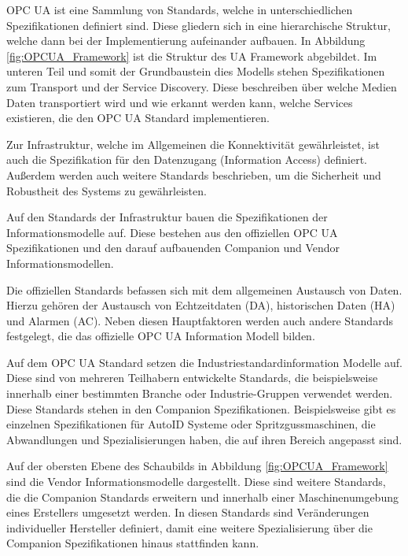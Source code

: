 \documentclass[a4paper, 12pt, oneside]{scrbook}
\begin{document}
		OPC UA ist eine Sammlung von Standards, welche in unterschiedlichen Spezifikationen definiert sind. Diese gliedern sich in eine hierarchische Struktur, welche dann bei der Implementierung aufeinander aufbauen. In Abbildung \ref{fig:OPCUA_Framework} ist die Struktur des UA Framework abgebildet. Im unteren Teil und somit der Grundbaustein dies Modells stehen Spezifikationen zum Transport und der Service Discovery. Diese beschreiben über welche Medien Daten transportiert wird und wie erkannt werden kann, welche Services existieren, die den OPC UA Standard implementieren. \cite{mahnke_opc_2009, rinke_was_2022}
		
		Zur Infrastruktur, welche im Allgemeinen die Konnektivität gewährleistet, ist auch die Spezifikation für den Datenzugang (Information Access) definiert. Außerdem werden auch weitere Standards beschrieben, um die Sicherheit und Robustheit des Systems zu gewährleisten.
		
		Auf den Standards der Infrastruktur bauen die Spezifikationen der Informationsmodelle auf. Diese bestehen aus den offiziellen OPC UA Spezifikationen und den darauf aufbauenden Companion und Vendor Informationsmodellen. \cite{mahnke_opc_2009}
		
		Die offiziellen Standards befassen sich mit dem allgemeinen Austausch von Daten. Hierzu gehören der Austausch von Echtzeitdaten (DA), historischen Daten (HA) und Alarmen (AC). Neben diesen Hauptfaktoren werden auch andere Standards festgelegt, die das offizielle OPC UA Information Modell bilden. \cite{mahnke_opc_2009, rinke_was_2022}
		
		Auf dem OPC UA Standard setzen die Industriestandardinformation Modelle auf. Diese sind von mehreren Teilhabern entwickelte Standards, die beispielsweise innerhalb einer bestimmten Branche oder Industrie-Gruppen verwendet werden. Diese Standards stehen in den Companion Spezifikationen. Beispielsweise gibt es einzelnen Spezifikationen für AutoID Systeme oder Spritzgussmaschinen, die Abwandlungen und Spezialisierungen haben, die auf ihren Bereich angepasst sind. \cite{mahnke_opc_2009, rinke_was_2022}
		
		Auf der obersten Ebene des Schaubilds in Abbildung \ref{fig:OPCUA_Framework} sind die Vendor Informationsmodelle dargestellt. Diese sind weitere Standards, die die Companion Standards erweitern und innerhalb einer Maschinenumgebung eines Erstellers umgesetzt werden. In diesen Standards sind Veränderungen individueller Hersteller definiert, damit eine weitere Spezialisierung über die Companion Spezifikationen hinaus stattfinden kann. \cite{mahnke_opc_2009, rinke_was_2022}
		
\end{document}
